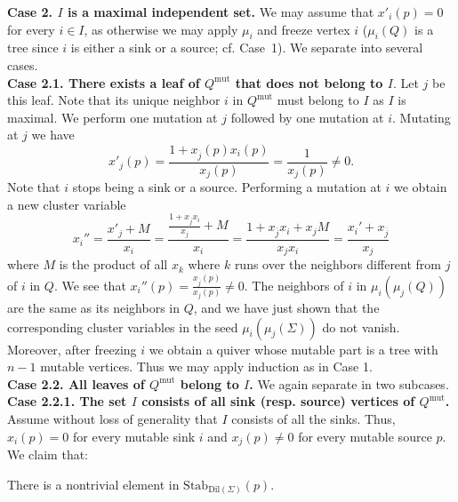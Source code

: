 \documentclass{amsart}
\newcommand{\seed}{\Sigma}
\newcommand{\mut}{\mathrm{mut}}
\newcommand{\Stab}{\mathrm{Stab}}
\numberwithin{equation}{section}
\theoremstyle{definition}
\newcommand{\dil}{\mathrm{Dil}}
\newcommand{\cS}[1]{\textcolor{purple}{[SN: \footnotesize $\blacksquare$ #1 $\blacksquare$]}}
\begin{document}
{\bf Case 2. $I$ is a maximal independent set.} 
We may assume that $x'_i(p) = 0$ for every $i \in I$, as otherwise we may apply $\mu_i$ and freeze vertex $i$ ($\mu_i(Q)$ is a tree since $i$ is either a sink or a source; cf. Case~1).
We separate into several cases.  \\

{\bf Case 2.1. There exists a leaf of $Q^{\mut}$ that does not belong to $I$}. Let $j$ be this leaf. Note that its unique neighbor $i$ in $Q^{\mut}$ must belong to $I$ as $I$ is maximal. 
We perform one mutation at $j$ followed by one mutation at $i$. Mutating at $j$ we have
\[
x'_{j}(p) = \frac{1 + x_{\overline{j}}(p)x_{i}(p)}{x_{j}(p)} = \frac{1}{x_{j}(p)} \neq 0. 
\]
Note that $i$ stops being a sink or a source. Performing a mutation at $i$ we obtain a new cluster variable
\[
 x_{i}'' = \frac{x'_{j} + M}{x_{i}} = \frac{\frac{1 + x_{\overline{j}}x_{i}}{x_{j}} + M}{x_{i}} = \frac{1 + x_{\overline{j}}x_{i} + x_{j}M}{x_{j}x_{i}} = \frac{x_{i}' + x_{\overline{j}}}{x_{j}} 
\]
where $M$ is the product of all $x_{k}$ where $k$ runs over the neighbors different from $j$ of $i$ in $Q$. We see that $x_{i}''(p) = \frac{x_{\overline{j}}(p)}{x_{j}(p)} \neq 0$. 
The neighbors of $i$ in $\mu_{i}(\mu_{j}(Q))$ are the same as its neighbors in $Q$, and we have just shown that the corresponding cluster variables in the seed $\mu_{i}(\mu_{j}(\seed))$ do not vanish. Moreover, after freezing $i$ we obtain a quiver whose mutable part is a tree with $n-1$ mutable vertices. Thus we may apply induction as in Case 1. \\

{\bf Case 2.2. All leaves of $Q^{\mut}$ belong to $I$.} We again separate in two subcases. \\

{\bf Case 2.2.1. The set $I$ consists of all sink (resp. source) vertices of $Q^{\mut}$. } %
Assume without loss of generality that $I$ consists of all the sinks. Thus, $x_i(p) = 0$ for every mutable sink $i$ and $x_j(p) \neq 0$ for every mutable source $p$. We claim that:

\begin{framed}
\begin{center}
There is a nontrivial element in $\Stab_{\dil(\seed)}(p)$.
\end{center}
\end{framed}
\end{document}
